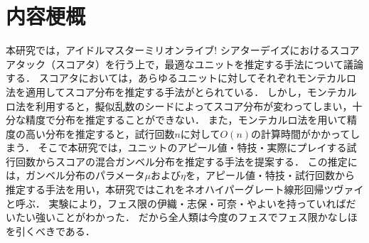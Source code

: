 \section*{内容梗概}

本研究では，アイドルマスターミリオンライブ! シアターデイズにおけるスコアアタック（スコアタ）を行う上で，最適なユニットを推定する手法について議論する．
スコアタにおいては，あらゆるユニットに対してそれぞれモンテカルロ法を適用してスコア分布を推定する手法がとられている\cite{mirishita-tool}．
しかし，モンテカルロ法を利用すると，擬似乱数のシードによってスコア分布が変わってしまい，十分な精度で分布を推定することができない．
また，モンテカルロ法を用いて精度の高い分布を推定すると，試行回数$n$に対して$O(n)$の計算時間がかかってしまう．
そこで本研究では，ユニットのアピール値・特技・実際にプレイする試行回数からスコアの混合ガンベル分布を推定する手法を提案する．
この推定には，ガンベル分布のパラメータ$\mu$および$\eta$を，アピール値・特技・試行回数から推定する手法を用い，本研究ではこれをネオハイパーグレート線形回帰ツヴァイと呼ぶ．
実験により，フェス限の伊織・志保・可奈・やよいを持っていればだいたい強いことがわかった．
だから全人類は今度のフェスでフェス限かなしほを引くべきである．
